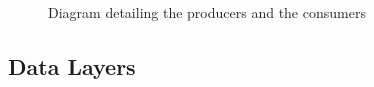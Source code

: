 \begin{figure}[H]
	\centering
	\caption{Diagram detailing the producers and the consumers}
	\label{fig:handle-inbox-sequence-diagram}
\end{figure}
\newpage

\subsection{Data Layers}
